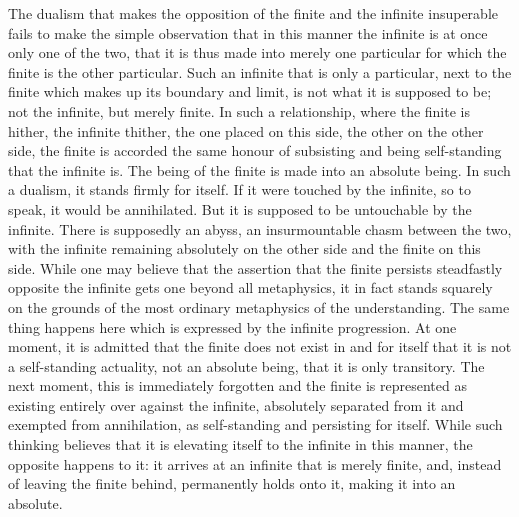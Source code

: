 The dualism that makes the opposition of the finite and the infinite
insuperable fails to make the simple observation that in this manner
the infinite is at once only one of the two, that it is thus made into
merely one particular for which the finite is the other particular.
Such an infinite that is only a particular, next to the finite which
makes up its boundary and limit, is not what it is supposed to be;
not the infinite, but merely finite.
In such a relationship, where the finite is hither, the infinite thither,
the one placed on this side, the other on the other side,
the finite is accorded the same honour of subsisting and
being self-standing that the infinite is.
The being of the finite is made into an absolute being.
In such a dualism, it stands firmly for itself.
If it were touched by the infinite,
so to speak, it would be annihilated.
But it is supposed to be untouchable by the infinite.
There is supposedly an abyss,
an insurmountable chasm between the two,
with the infinite remaining absolutely on the other side
and the finite on this side.
While one may believe that the assertion
that the finite persists steadfastly opposite the infinite
gets one beyond all metaphysics,
it in fact stands squarely on the grounds of
the most ordinary metaphysics of the understanding.
The same thing happens here which is expressed
by the infinite progression.
At one moment, it is admitted that the finite
does not exist in and for itself
that it is not a self-standing actuality,
not an absolute being,
that it is only transitory.
The next moment, this is immediately forgotten
and the finite is represented as existing entirely
over against the infinite,
absolutely separated from it
and exempted from annihilation,
as self-standing and persisting for itself.
While such thinking believes that it is elevating itself
to the infinite in this manner, the opposite happens to it:
it arrives at an infinite that is merely finite,
and, instead of leaving the finite behind,
permanently holds onto it, making it into an absolute.

